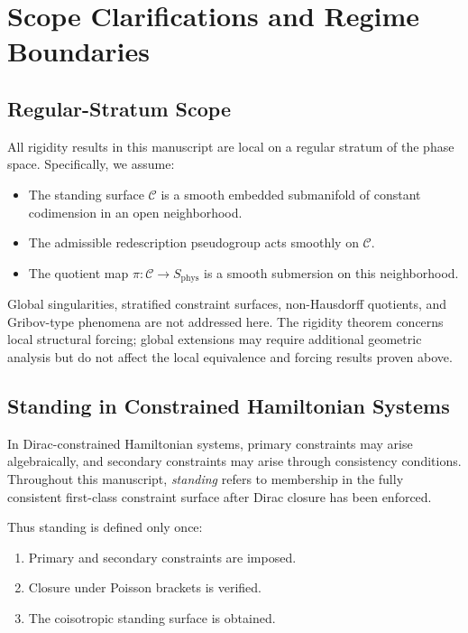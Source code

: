 \documentclass[11pt]{article}
\theoremstyle{remark}
\theoremstyle{plain}
\begin{document}
\section{Scope Clarifications and Regime Boundaries}

\subsection{Regular-Stratum Scope}

All rigidity results in this manuscript are local on a regular stratum of the phase space.
Specifically, we assume:

\begin{itemize}
\item The standing surface $\mathcal{C}$ is a smooth embedded submanifold of constant codimension in an open neighborhood.
\item The admissible redescription pseudogroup acts smoothly on $\mathcal{C}$.
\item The quotient map $\pi:\mathcal{C}\to S_{\mathrm{phys}}$ is a smooth submersion on this neighborhood.
\end{itemize}

Global singularities, stratified constraint surfaces, non-Hausdorff quotients,
and Gribov-type phenomena are not addressed here.
The rigidity theorem concerns local structural forcing;
global extensions may require additional geometric analysis
but do not affect the local equivalence and forcing results proven above.

\subsection{Standing in Constrained Hamiltonian Systems}

In Dirac-constrained Hamiltonian systems, primary constraints may arise algebraically,
and secondary constraints may arise through consistency conditions.
Throughout this manuscript, \emph{standing} refers to membership in the fully consistent
first-class constraint surface after Dirac closure has been enforced.

Thus standing is defined only once:
\begin{enumerate}
\item Primary and secondary constraints are imposed.
\item Closure under Poisson brackets is verified.
\item The coisotropic standing surface is obtained.
\end{enumerate}
\end{document}
